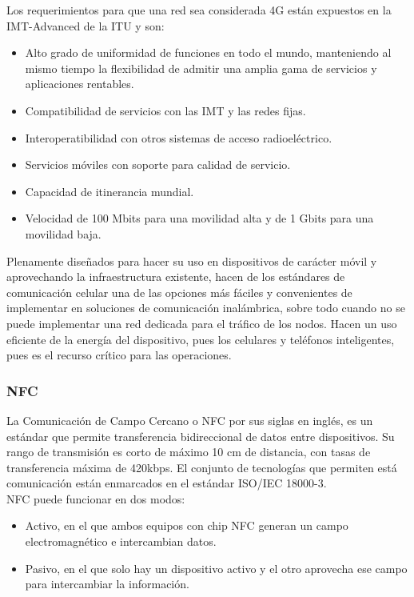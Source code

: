 Los requerimientos para que una red sea considerada 4G  están expuestos en la IMT-Advanced de la ITU y son:
\begin{itemize}
\item Alto grado de uniformidad de funciones en todo el mundo, manteniendo al mismo tiempo la flexibilidad de admitir una amplia gama de servicios y aplicaciones rentables.
\item Compatibilidad de servicios con las IMT y las redes fijas.
\item Interoperatibilidad con otros sistemas de acceso radioeléctrico.
\item Servicios móviles con soporte para calidad de servicio.
\item Capacidad de itinerancia mundial.
\item Velocidad de 100 Mbits para una movilidad alta y de 1 Gbits para una movilidad baja.
\end{itemize}

Plenamente diseñados para hacer su uso en dispositivos de carácter móvil y aprovechando la infraestructura existente, hacen de los estándares de comunicación celular una de las opciones más fáciles y convenientes de implementar en soluciones de comunicación inalámbrica, sobre todo cuando no se puede implementar una red dedicada para el tráfico de los nodos. Hacen un uso eficiente de la energía del dispositivo, pues los celulares y teléfonos inteligentes, pues es el recurso crítico para las operaciones.

\subsubsection{NFC}
La Comunicación de Campo Cercano o NFC  por sus siglas en inglés, es un estándar que permite transferencia bidireccional de datos entre dispositivos. Su rango de transmisión es corto de máximo 10 cm de distancia, con tasas de transferencia máxima de 420kbps. El conjunto de tecnologías que permiten está comunicación están enmarcados en el estándar ISO/IEC 18000-3.\cite{isonfc}\\

NFC puede funcionar en dos modos:
\begin{itemize}
\item Activo, en el que ambos equipos con chip NFC generan un campo electromagnético e intercambian datos.
\item Pasivo, en el que solo hay un dispositivo activo y el otro aprovecha ese campo para intercambiar la información.
\end{itemize}

